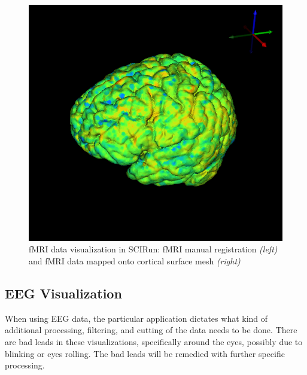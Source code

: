 \begin{figure}[H]
\begin{center}
\includegraphics[width=.75\textwidth]{Figures/fmri_1}
\caption{fMRI data visualization in SCIRun: fMRI manual registration \textit{(left)} and fMRI data mapped onto cortical surface mesh \textit{(right)}}
\label{fig:fmrivis}
\end{center}
\end{figure}

\subsection{EEG Visualization}

When using EEG data, the particular application dictates what kind of additional processing, filtering, and cutting of the data needs to be done. There are bad leads in these visualizations, specifically around the eyes, possibly due to blinking or eyes rolling. The bad leads will be remedied with further specific processing.

